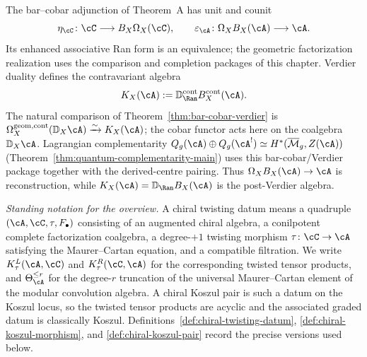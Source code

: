 The bar--cobar adjunction of Theorem~A has unit and counit
\[
\eta_\cC\colon\cC\longrightarrow B_X\Omega_X(\cC),
\qquad
\varepsilon_\cA\colon\Omega_XB_X(\cA)\longrightarrow\cA.
\]
Its enhanced associative Ran form is an equivalence; the geometric
factorization realization uses the comparison and completion packages
of this chapter. Verdier duality defines the contravariant algebra
\[
K_X(\cA):=\mathbb D_{\Ran}^{\mathrm{cont}}B_X^{\mathrm{cont}}(\cA).
\]
The natural comparison of Theorem~\ref{thm:bar-cobar-verdier} is
$\Omega_X^{\mathrm{geom,cont}}(\mathbb D_X\cA)\xrightarrow{\sim}
K_X(\cA)$; the cobar functor acts here on the coalgebra
$\mathbb D_X\cA$. Lagrangian
complementarity
$Q_g(\cA) \oplus Q_g(\cA^!) \simeq
H^*(\overline{\mathcal{M}}_g, Z(\cA))$
(Theorem~\ref{thm:quantum-complementarity-main}) uses this
bar-cobar/Verdier package together with the derived-centre pairing.
Thus $\Omega_XB_X(\cA)\to\cA$ is reconstruction, while
$K_X(\cA)=\mathbb D_{\Ran}B_X(\cA)$ is the post-Verdier algebra.

\smallskip\noindent\textit{Standing notation for the overview.}
A chiral twisting datum means a quadruple
$(\cA,\cC,\tau,F_\bullet)$ consisting of an augmented chiral algebra,
a conilpotent complete factorization coalgebra, a degree-$+1$
twisting morphism $\tau\colon \cC\to \cA$ satisfying the
Maurer--Cartan equation, and a compatible filtration. We write
$K_\tau^L(\cA,\cC)$ and $K_\tau^R(\cC,\cA)$ for the corresponding
twisted tensor products, and $\Theta_\cA^{\leq r}$ for the degree-$r$
truncation of the universal Maurer--Cartan element of the modular
convolution algebra. A chiral Koszul pair is such a datum on the
Koszul locus, so the twisted tensor products are acyclic and the
associated graded datum is classically Koszul.
Definitions~\ref{def:chiral-twisting-datum},
\ref{def:chiral-koszul-morphism}, and \ref{def:chiral-koszul-pair}
record the precise versions used below.

